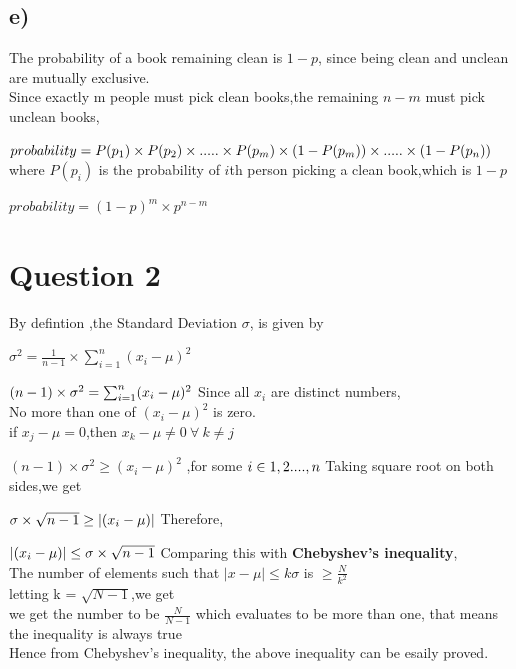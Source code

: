 \documentclass{article}
\begin{document}
\subsection*{e)}
    The probability of a book remaining clean is $1-p$, since being clean and unclean are mutually exclusive.\\
    Since exactly m people must pick clean books,the remaining $n-m$ must pick unclean books,
    \par
    $probability=P(p_1)\times P(p_2)\times .....\times P(p_{m})\times (1-P(p_{m}))\times .....\times (1-P(p_{n}))\\$
    where $P(p_{i})$ is the probability of $i$th person picking a clean book,which is $1-p$
    \par
    $probability=(1-p)^m\times p^{n-m}$
\section* {Question 2}
    By defintion ,the Standard Deviation $\sigma$, is given by 
    \par
    $\sigma^2=\frac{1}{n-1} \times \sum_{i=1}^{n} (x_i-\mu)^2 $
    \par
    $(n-1)\times \sigma^2=\sum_{i=1}^{n} (x_i-\mu)^2 \\$
    Since all $x_i$ are distinct numbers,\\ 
    No more than one of $(x_i-\mu)^2$ is zero.\\
    if $x_j-\mu=0 $,then $x_k-\mu \neq 0 \ \forall \ k \neq j$
    \par 
    $(n-1)\times \sigma^2 \geq (x_i-\mu)^2 $ ,for some $i \in {1,2....,n}\\$
    Taking square root on both sides,we get
    \par 
    $\sigma \times \sqrt{n-1} \geq |(x_i-\mu)|\\$
    Therefore,
    \par 
    $|(x_i-\mu)| \leq \sigma \times \sqrt{n-1}\\$
    \newline
    Comparing this with \textbf{Chebyshev's inequality},\\
    The number of elements such that $|x-\mu|\leq k \sigma$ is $\geq \frac{N}{k^2}$\\
    letting k = $\sqrt{N-1}$,we get\\
    we get the number to be $\frac{N}{N-1}$ which evaluates to be more than one,
    that means the inequality is always true\\
    Hence from Chebyshev's inequality, the above inequality can be esaily proved.
    
\end{document}
